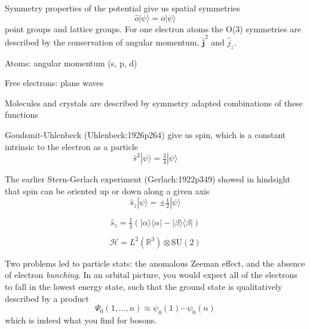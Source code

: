Symmetry properties of the potential give us spatial symmetries
\begin{equation}
    \hat{o}
    |\psi\rangle
    =
    o
    |\psi\rangle
\end{equation}
point groups and lattice groups.
For one electron atoms the O(3) symmetries are described by the conservation of
angular momentum, \(\hat{\mathbf{j}}^2\) and \(\hat{j}_z\).

\noindent
Atoms: angular momentum (s, p, d)

\noindent
Free electrons: plane waves

\noindent
Molecules and crystals are described by symmetry adapted combinations of these
functions


Goudsmit-Uhlenbeck (Uhlenbeck:1926p264) give us spin, which is a constant intrinsic to the electron
as a particle
\begin{equation}
    \hat{s}^2
    |\psi\rangle
    =
    \tfrac{3}{4}
    |\psi\rangle
\end{equation}

The earlier Stern-Gerlach experiment (Gerlach:1922p349) showed in hindsight that
spin can be oriented up or down along a given axis
\begin{equation}
    \hat{s}_z
    |\psi\rangle
    =
    \pm
    \tfrac{1}{2}
    |\psi\rangle
\end{equation}

\begin{equation}
    \hat{s}_z
    =
    \tfrac{1}{2}
    (
        |\alpha\rangle\langle\alpha|
        -
        |\beta\rangle\langle\beta|
    )
\end{equation}

\begin{equation}
    \mathcal{H}
    =
    L^2(\mathbb{R}^3)
    \otimes
    \mathrm{SU}(2)
\end{equation}


Two problems led to particle stats: the anomalous Zeeman effect, and the absence
of electron {\itshape bunching}.
In an orbital picture, you would expect all of the electrons to fall in the
lowest energy state, such that the ground state is qualitatively described by a
product
\begin{equation}
    \Psi_0(1,\ldots,n)
    \approx
    \psi_0(1)
    \cdots
    \psi_0(n)
\end{equation}
which is indeed what you find for bosons.

